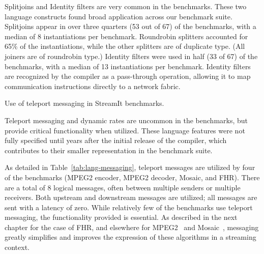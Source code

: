 
\item {\boldit Splitjoins and Identity filters are very common in the 
benchmarks.}  These two language constructs found broad application
across our benchmark suite.  Splitjoins appear in over three quarters
(53 out of 67) of the benchmarks, with a median of 8 instantiations
per benchmark.  Roundrobin splitters accounted for 65\% of the
instantiations, while the other splitters are of duplicate type.  (All
joiners are of roundrobin type.)  Identity filters were used in half
(33 of 67) of the benchmarks, with a median of 13 instantiations per
benchmark.  Identity filters are recognized by the compiler as a
pass-through operation, allowing it to map communication instructions
directly to a network fabric.

\begin{table}[t!]
\caption{Use of teleport messaging in StreamIt 
benchmarks.\protect\label{tab:lang-messaging}}
\end{table}

\item {\boldit Teleport messaging and dynamic rates are uncommon in 
the benchmarks, but provide critical functionality when utilized.}
These language features were not fully specified until years after the
initial release of the compiler, which contributes to their smaller
representation in the benchmark suite.

As detailed in Table~\ref{tab:lang-messaging}, teleport messages are
utilized by four of the benchmarks (MPEG2 encoder, MPEG2 decoder,
Mosaic, and FHR).  There are a total of 8 logical messages, often
between multiple senders or multiple receivers.  Both upstream and
downstream messages are utilized; all messages are sent with a latency
of zero.  While relatively few of the benchmarks use teleport
messaging, the functionality provided is essential.  As described in
the next chapter for the case of FHR, and elsewhere for
MPEG2~\cite{drake-thesis} and Mosaic~\cite{aziz-thesis}, messaging
greatly simplifies and improves the expression of these algorithms in
a streaming context.

